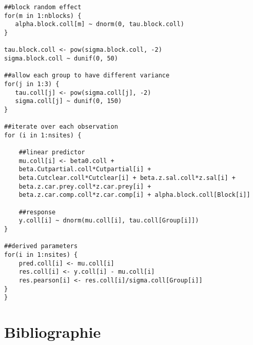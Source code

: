 \begin{lstlisting}
##block random effect
for(m in 1:nblocks) {
   alpha.block.coll[m] ~ dnorm(0, tau.block.coll)
}

tau.block.coll <- pow(sigma.block.coll, -2)
sigma.block.coll ~ dunif(0, 50)

##allow each group to have different variance
for(j in 1:3) {
   tau.coll[j] <- pow(sigma.coll[j], -2)
   sigma.coll[j] ~ dunif(0, 150)
}

##iterate over each observation
for (i in 1:nsites) {

    ##linear predictor  
    mu.coll[i] <- beta0.coll +
    beta.Cutpartial.coll*Cutpartial[i] +
    beta.Cutclear.coll*Cutclear[i] + beta.z.sal.coll*z.sal[i] +
    beta.z.car.prey.coll*z.car.prey[i] +
    beta.z.car.comp.coll*z.car.comp[i] + alpha.block.coll[Block[i]]

    ##response
    y.coll[i] ~ dnorm(mu.coll[i], tau.coll[Group[i]])
}

##derived parameters
for(i in 1:nsites) {
    pred.coll[i] <- mu.coll[i]
    res.coll[i] <- y.coll[i] - mu.coll[i]
    res.pearson[i] <- res.coll[i]/sigma.coll[Group[i]]
}
}
\end{lstlisting}

\clearpage

\chapter*{Bibliographie}         
\label{chap:biblio}         

\nocite{*}
\renewcommand{\bibsection}{}
\begin{otherlanguage}{english}


\end{otherlanguage}
